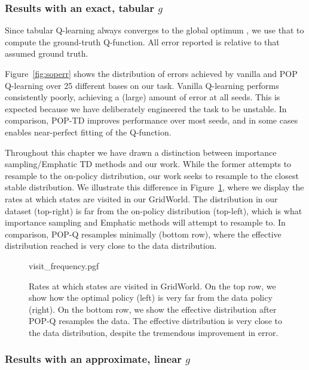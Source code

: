 \subsubsection[Results with a tabular g]{Results with an exact, tabular $g$}

Since tabular Q-learning always converges to the global optimum \cite{watkins1992q}, we use that to compute the ground-truth Q-function. All error reported is relative to that assumed ground truth.

Figure~\ref{fig:soperr} shows the distribution of errors achieved by vanilla and POP Q-learning over 25 different bases on our task. Vanilla Q-learning performs consistently poorly, achieving a (large) amount of error at all seeds. This is expected because we have deliberately engineered the task to be unstable. In comparison, POP-TD improves performance over most seeds, and in some cases enables near-perfect fitting of the Q-function.

Throughout this chapter we have drawn a distinction between importance sampling/Emphatic TD methods and our work. While the former attempts to resample to the on-policy distribution, our work seeks to resample to the closest stable distribution. We illustrate this difference in Figure~\ref{fig:popresampling}, where we display the rates at which states are visited in our GridWorld. The distribution in our dataset (top-right) is far from the on-policy distribution (top-left), which is what importance sampling and Emphatic methods will attempt to resample to. In comparison, POP-Q resamples minimally (bottom row), where the effective distribution reached is very close to the data distribution.


\begin{figure}[t]
  \centering
  {visit_frequency.pgf}
  \caption{Rates at which states are visited in GridWorld. On the top row, we show how the optimal policy (left) is very far from the data policy (right). On the bottom row, we show the effective distribution after POP-Q resamples the data. The effective distribution is very close to the data distribution, despite the tremendous improvement in error. }
  \label{fig:popresampling}
\end{figure}


\subsubsection[Results with a linear g]{Results with an approximate, linear $g$}

